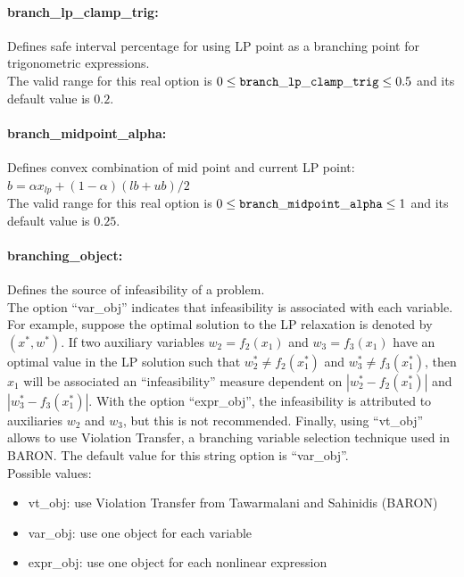 \paragraph{branch\_lp\_clamp\_trig:}\label{sec:branch_lp_clamp_trig} Defines safe interval percentage for using LP point as a branching point for trigonometric expressions. $\;$ \\
The valid range for this real option is 
$0 \le {\tt branch\_lp\_clamp\_trig } \le 0.5$
and its default value is $0.2$.

\paragraph{branch\_midpoint\_alpha:}\label{sec:branch_midpoint_alpha} Defines convex combination of mid point and current LP point: $b = \alpha x_{lp} + (1-\alpha) (lb+ub)/2$ $\;$ \\
The valid range for this real option is $0 \le {\tt branch\_midpoint\_alpha } \le 1$ and its default value is $0.25$.

\paragraph{branching\_object:}\label{sec:branching_object} Defines the source of infeasibility of a problem. $\;$ \\
The option ``var\_obj'' indicates that infeasibility is associated with each variable.
For example, suppose the optimal solution to the LP relaxation is denoted by $(x^*,w^*)$. If two auxiliary variables $w_2 = f_2(x_1)$ and $w_3 = f_3(x_1)$ have an optimal value in the LP solution such that $w_2^* \neq f_2(x_1^*)$ and $w_3^* \neq
f_3(x_1^*)$, then $x_1$ will be associated an ``infeasibility'' measure dependent on
$|w_2^* - f_2(x_1^*)|$ and $|w_3^* - f_3(x_1^*)|$.
With the option ``expr\_obj'', the infeasibility is attributed to auxiliaries $w_2$ and $w_3$, but this is not recommended. Finally, using ``vt\_obj'' allows to use Violation Transfer, a branching variable selection technique used in BARON.
The default value for this string option is ``var\_obj''. \\
Possible values:
\begin{itemize}
   \item vt\_obj: use Violation Transfer from Tawarmalani and Sahinidis (BARON)
   \item var\_obj: use one object for each variable
   \item expr\_obj: use one object for each nonlinear expression
\end{itemize}

